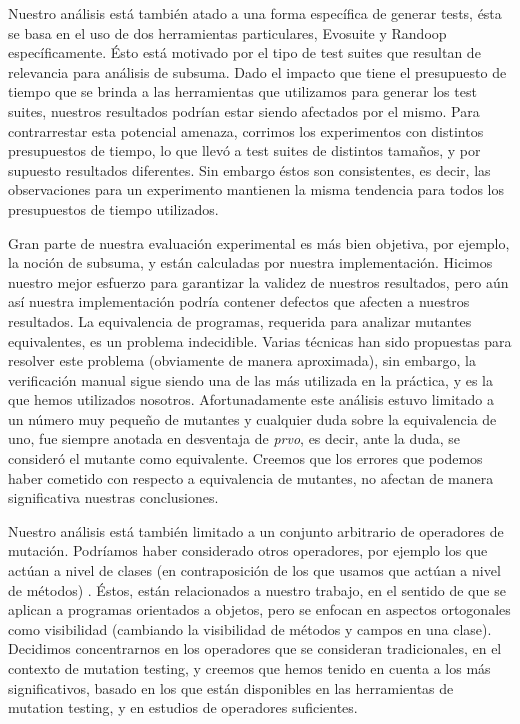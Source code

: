 Nuestro an\'alisis est\'a tambi\'en atado a una forma espec\'ifica de generar tests, \'esta se basa en el uso de dos herramientas particulares, Evosuite y Randoop espec\'ificamente. \'Esto est\'a motivado por el tipo de test suites que resultan de relevancia para an\'alisis de subsuma. Dado el impacto que tiene el presupuesto de tiempo que se brinda a las herramientas que utilizamos para generar los test suites, nuestros resultados podr\'ian estar siendo afectados por el mismo. Para contrarrestar esta potencial amenaza, corrimos los experimentos con distintos presupuestos de tiempo, lo que llev\'o a test suites de distintos tama\~nos, y por supuesto resultados diferentes. Sin embargo \'estos son consistentes, es decir, las observaciones para un experimento mantienen la misma tendencia para todos los presupuestos de tiempo utilizados.

Gran parte de nuestra evaluaci\'on experimental es m\'as bien objetiva, por ejemplo, la noci\'on de subsuma, y est\'an calculadas por nuestra implementaci\'on. Hicimos nuestro mejor esfuerzo para garantizar la validez de nuestros resultados, pero a\'un as\'i nuestra implementaci\'on podr\'ia contener defectos que afecten a nuestros resultados. La equivalencia de programas, requerida para analizar mutantes equivalentes, es un problema indecidible. Varias t\'ecnicas han sido propuestas para resolver este problema (obviamente de manera aproximada), sin embargo, la verificaci\'on manual sigue siendo una de las m\'as utilizada en la pr\'actica, y es la que hemos utilizados nosotros. Afortunadamente este an\'alisis estuvo limitado a un n\'umero muy peque\~no de mutantes y cualquier duda sobre la equivalencia de uno, fue siempre anotada en desventaja de \emph{prvo}, es decir, ante la duda, se consider\'o el mutante como equivalente. Creemos que los errores que podemos haber cometido con respecto a equivalencia de mutantes, no afectan de manera significativa nuestras conclusiones.

Nuestro an\'alisis est\'a tambi\'en limitado a un conjunto arbitrario de operadores de mutaci\'on. Podr\'iamos haber considerado otros operadores, por ejemplo los que act\'uan a nivel de clases (en contraposici\'on de los que usamos que act\'uan a nivel de m\'etodos) \cite{bibliography.mutation.class-level-ops}. \'Estos, est\'an relacionados a nuestro trabajo, en el sentido de que se aplican a programas orientados a objetos, pero se enfocan en aspectos ortogonales como visibilidad (cambiando la visibilidad de m\'etodos y campos en una clase). Decidimos concentrarnos en los operadores que se consideran tradicionales, en el contexto de mutation testing, y creemos que hemos tenido en cuenta a los m\'as significativos, basado en los que est\'an disponibles en las herramientas de mutation testing, y en estudios de operadores suficientes.

